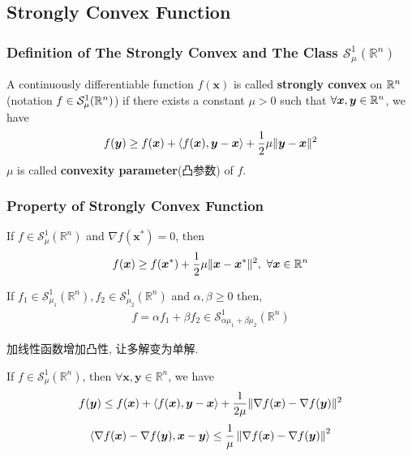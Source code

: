 \subsection{Strongly Convex Function}
\subsubsection{Definition of The Strongly Convex and The Class \texorpdfstring{$\mathcal{S}_{\mu}^1(\mathbb{R}^n)$}.}

\begin{definition}
    A continuously differentiable function $f(\bm x)$ is called \textbf{strongly convex} on $\mathbb{R}^n$ (notation $f\in\mathcal{S}_\mu^1(\mathbb{R}^n)$) if there exists a constant $\mu>0$ such that $\forall \bm{x},\bm{y}\in\mathbb{R}^n$, we have
    \begin{align*}
        f(\bm y)\ge f(\bm x) +\braket{f(\bm x), \bm y-\bm x} +\frac{1}{2}\mu \|\bm y-\bm x\|^2
    \end{align*}
    $\mu$ is called \textbf{convexity parameter}(凸参数) of $f$. 
\end{definition}

\subsubsection{Property of Strongly Convex Function}

\begin{theorem}
    If $f\in \mathcal{S}_\mu^1(\mathbb{R}^n)$ and $\nabla f(\bm x^*)=0$, then 
    \begin{align*}
        f(\bm x)\ge f(\bm x^*)+\frac{1}{2}\mu\|\bm x-\bm x^*\|^2,\ \forall \bx\in\R^n
    \end{align*}
\end{theorem}

\begin{lemma}
    If $f_1\in \mathcal{S}_{\mu_1}^1(\mathbb{R}^n), f_2 \in \mathcal{S}_{\mu_2}^1(\mathbb{R}^n)$ and $\alpha,\beta\ge 0$ then,
    \begin{align*}
        f=\alpha f_1+\beta f_2\in \mathcal{S}_{\alpha \mu_1+\beta \mu _2}^1(\mathbb{R}^n)
    \end{align*}
\end{lemma}

加线性函数增加凸性, 让多解变为单解. 

\begin{theorem}
    If $f\in \mathcal{S}_\mu^1(\mathbb{R}^n)$, then $\forall \bm x,\bm y\in \mathbb{R}^n$, we have
    \begin{equation}
        f(\bm y)\le f(\bm x)+ \braket{f(\bm x),\bm y-\bm x} +\frac{1}{2\mu}\|\nabla f(\bm x)-\nabla f(\bm y)\|^2
    \end{equation}
    \begin{equation}
        \braket{\nabla f(\bm{x})-\nabla f(\bm{y}),\bm{x}-\bm{y}}\le \frac{1}{\mu}\left\lVert\nabla f(\bm{x})-\nabla f(\bm{y})\right\rVert^2
    \end{equation}
\end{theorem}


